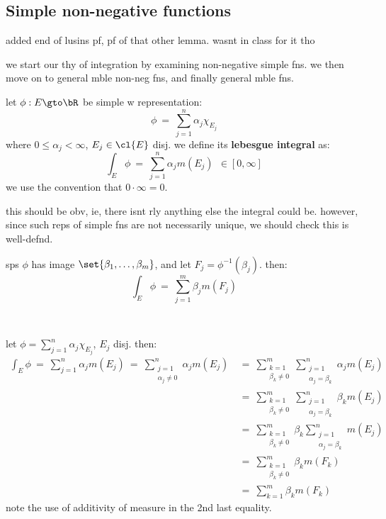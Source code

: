 \subsection{Simple non-negative functions}
added end of lusins pf, pf of that other lemma.
wasnt in class for it tho

we start our thy of integration by examining non-negative simple fns.
we then move on to general mble non-neg fns, and finally general mble fns.

\begin{defn}
	let $\phi:E\gto\bR$ be simple w representation:
	\begin{equation*}
		\phi \ = \ \sum_{j=1}^{n}\alpha_{j}\chi_{E_{j}}
	\end{equation*}
	where $0\leq\alpha_{j}<\infty$, $E_{j}\in\cl{E}$ disj.
	we define its \textbf{lebesgue integral} as:
	\begin{equation*}
		\int_{E}\phi \ = \ \sum_{j=1}^{n}\alpha_{j}m(E_{j}) \ \ \in [0,\infty]
	\end{equation*}
	we use the convention that $0\cdot \infty=0$.
\end{defn}
this should be obv, ie, there isnt rly anything else the integral could be.
however, since such reps of simple fns are not necessarily unique,
we should check this is well-defnd.

\begin{lm}
	sps $\phi$ has image $\set{\beta_{1},\dots,\beta_{m}}$, and let $F_{j}=\phi^{-1}(\beta_{j})$.
	then:
	\begin{equation*}
		\int_{E}\phi \ = \ \sum_{j=1}^{m}\beta_{j}m(F_{j})
	\end{equation*}
\end{lm} \

\begin{pf}
	let $\phi=\sum_{j=1}^{n}\alpha_{j}\chi_{E_{j}}$, $E_{j}$ disj. then:
	\begin{align*}
		\int_{E}\phi \ = \ \sum_{j=1}^{n}\alpha_{j}m(E_{j})
		\ = \ \sum_{\substack{j=1 \\ \alpha_{j}\neq0}}^{n}\alpha_{j}m(E_{j})
		& \ = \ \sum_{\substack{k=1 \\ \beta_{k}\neq0}}^{m}\sum_{\substack{j=1 \\ \alpha_{j}=\beta_{k}}}^{n}\alpha_{j}m(E_{j}) \\
		& \ = \ \sum_{\substack{k=1 \\ \beta_{k}\neq0}}^{m}\sum_{\substack{j=1 \\ \alpha_{j}=\beta_{k}}}^{n}\beta_{k}m(E_{j}) \\
		& \ = \ \sum_{\substack{k=1 \\ \beta_{k}\neq0}}^{m}\beta_{k}\sum_{\substack{j=1 \\ \alpha_{j}=\beta_{k}}}^{n}m(E_{j}) \\
		& \ = \ \sum_{\substack{k=1 \\ \beta_{k}\neq0}}^{m}\beta_{k}m(F_{k}) \\
		& \ = \ \sum_{k=1}^{m}\beta_{k}m(F_{k})
	\end{align*}
	note the use of additivity of measure in the 2nd last equality.
\end{pf} \

